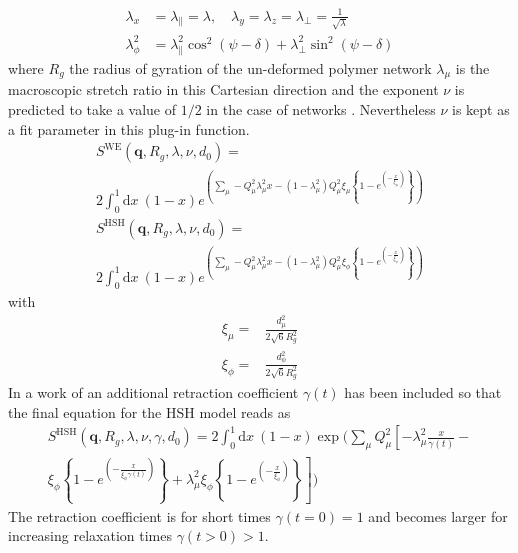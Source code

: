 \begin{align}
  \lambda_x &=\lambda_{\|}=\lambda, \quad \lambda_y=\lambda_z=\lambda_\perp=\frac{1}{\sqrt{\lambda}} \\
  \lambda_\phi^2 &= \lambda_{\|}^2 \cos^2(\psi-\delta)+\lambda_\perp^2\sin^2(\psi-\delta)
\end{align}
where $R_g$ the radius of gyration of the un-deformed polymer network $\lambda_\mu$ is the macroscopic stretch ratio in this Cartesian direction and the exponent $\nu$ is predicted to take a value of $1/2$ in the case of networks \cite{Straube1995,Read2004}.  Nevertheless $\nu$ is kept as a fit parameter in this plug-in function.
\begin{multline}
\label{eq:SQ_WE_HSH}
S^\mathrm{WE}(\mathbf{q},R_g,\lambda,\nu,d_0) = \\ 2\int_0^1\mathrm{d}x\: (1-x) e^{\left(\sum_{\mu} -Q_\mu^2\lambda_\mu^2 x-
(1-\lambda_\mu^2)Q_\mu^2\xi_\mu\left\{1-e^{\left(-\frac{x}{\xi_\mu}\right)}\right\}\right)}
\end{multline}
\begin{multline}
S^\mathrm{HSH}(\mathbf{q},R_g,\lambda,\nu,d_0) = \\ 2\int_0^1\mathrm{d}x\: (1-x) e^{\left(\sum_{\mu} -Q_\mu^2\lambda_\mu^2 x- %
 (1-\lambda_\mu^2)Q_\mu^2\xi_\phi\left\{1-e^{\left(-\frac{x}{\xi_\phi}\right)}\right\}\right)}
\end{multline}
with
\begin{align}
  \xi_\mu =& \frac{d_\mu^2}{2\sqrt{6}R_g^2} \\
  \xi_\phi =& \frac{d_\phi^2}{2\sqrt{6}R_g^2}
\end{align}
In a work of \cite{Ariane2004} an additional retraction coefficient $\gamma(t)$ has been included so that the final equation for the HSH model reads as
\begin{multline}
\label{eq:SQ_HSH_retraction}
S^\mathrm{HSH}(\mathbf{q},R_g,\lambda,\nu,\gamma,d_0) =  2\int_0^1\mathrm{d}x\: (1-x) \exp\Bigg(\sum_{\mu} Q_\mu^2\left[-\lambda_\mu^2\frac{x}{\gamma(t)}- \right. \\
\left. \xi_\phi\left\{1-e^{\left(-\frac{x}{\xi_\phi\gamma(t)}\right)}\right\} +\lambda_\mu^2\xi_\phi\left\{1-e^{\left(-\frac{x}{\xi_\phi}\right)}\right\} \right]\Bigg)
\end{multline}
The retraction coefficient is for short times $\gamma(t=0)=1$ and becomes larger for increasing relaxation times $\gamma(t>0)>1$.

